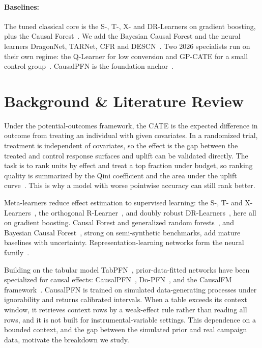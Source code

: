 \documentclass[twocolumn]{style}
\begin{document}
\paragraph{Baselines:} The tuned classical core is the S-, T-, X- and DR-Learners on gradient
boosting, plus the Causal Forest~\cite{athey2019grf, battocchi2019econml,
kennedy2023drlearner, kunzel2019metalearners, nie2021rlearner, wager2018causalforest}. We add the
Bayesian Causal Forest and the neural learners DragonNet, TARNet, CFR and
DESCN~\cite{curth2021catenets, hahn2020bcf, shalit2017cfr, shi2019dragonnet,
zhong2022descn}. Two 2026 specialists run on their own regime: the Q-Learner for low conversion
and GP-CATE for a small control group~\cite{fuchs2026qlearner, gpcate2026}. CausalPFN is the
foundation anchor~\cite{balazadeh2025causalpfn}.

\section{Background \& Literature Review}
Under the potential-outcomes framework, the CATE is the expected difference in outcome from treating
an individual with given covariates. In a randomized trial, treatment is independent of covariates,
so the effect is the gap between the treated and control response surfaces and uplift can be
validated directly. The task is to rank units by effect and treat a top fraction under budget, so
ranking quality is summarized by the Qini coefficient and the area under the uplift
curve~\cite{devriendt2018uplift}. This is why a model with worse pointwise accuracy can still rank
better.

Meta-learners reduce effect estimation to supervised learning: the S-, T- and
X-Learners~\cite{kunzel2019metalearners}, the orthogonal R-Learner~\cite{nie2021rlearner}, and doubly
robust DR-Learners~\cite{kennedy2023drlearner}, here all on gradient boosting. Causal Forest and
generalized random forests~\cite{wager2018causalforest, athey2019grf}, and Bayesian Causal
Forest~\cite{hahn2020bcf}, strong on semi-synthetic benchmarks, add mature baselines with
uncertainty. Representation-learning networks form the neural
family~\cite{shalit2017cfr, shi2019dragonnet, zhong2022descn}.

Building on the tabular model TabPFN~\cite{hollmann2025tabpfn}, prior-data-fitted networks have been
specialized for causal effects: CausalPFN~\cite{balazadeh2025causalpfn},
Do-PFN~\cite{robertson2025dopfn}, and the CausalFM framework~\cite{causalfm2025}. CausalPFN is
trained on simulated data-generating processes under ignorability and returns calibrated intervals.
When a table exceeds its context window, it retrieves context rows by a weak-effect rule rather than
reading all rows, and it is not built for instrumental-variable settings. This dependence on a
bounded context, and the gap between the simulated prior and real campaign data, motivate the
breakdown we study.
\end{document}
